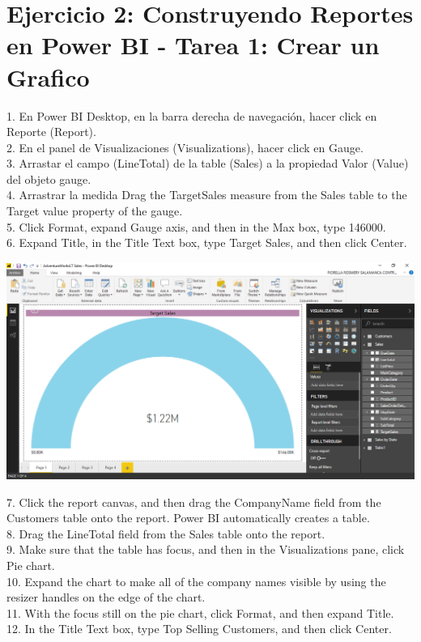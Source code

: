 \section{Ejercicio 2: Construyendo Reportes en Power BI - Tarea 1: Crear un Grafico} 

1. En Power BI Desktop, en la barra derecha de navegación, hacer click en Reporte (Report).\\
2. En el panel de Visualizaciones (Visualizations), hacer click en Gauge.\\
3. Arrastar el campo (LineTotal) de la table (Sales) a la propiedad Valor (Value) del objeto gauge.\\
4. Arrastrar la medida Drag the TargetSales measure from the Sales table to the Target value property of the
gauge.\\
5. Click Format, expand Gauge axis, and then in the Max box, type 146000.\\
6. Expand Title, in the Title Text box, type Target Sales, and then click Center.\\

	\begin{center}
	\includegraphics[width=17cm]{./Imagenes/Ejercicio2/Tarea1/1}
	\end{center}	

7. Click the report canvas, and then drag the CompanyName field from the Customers table onto the
report. Power BI automatically creates a table.\\
8. Drag the LineTotal field from the Sales table onto the report.\\
9. Make sure that the table has focus, and then in the Visualizations pane, click Pie chart.\\
10. Expand the chart to make all of the company names visible by using the resizer handles on the edge
of the chart.\\
11. With the focus still on the pie chart, click Format, and then expand Title.\\
12. In the Title Text box, type Top Selling Customers, and then click Center.\\

